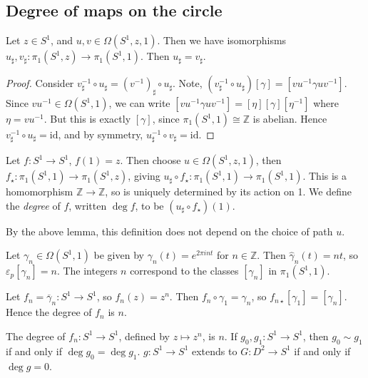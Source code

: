 \subsection{Degree of maps on the circle}
\begin{lemma}
	Let \( z \in S^1 \), and \( u, v \in \Omega(S^1, z, 1) \).
	Then we have isomorphisms \( u_\sharp, v_\sharp \colon \pi_1(S^1, z) \to \pi_1(S^1, 1) \).
	Then \( u_\sharp = v_\sharp \).
\end{lemma}
\begin{proof}
	Consider \( v_\sharp^{-1} \circ u_\sharp = (v^{-1})_\sharp \circ u_\sharp \).
	Note, \( (v_\sharp^{-1} \circ u_\sharp)[\gamma] = [vu^{-1}\gamma uv^{-1}] \).
	Since \( vu^{-1} \in \Omega(S^1, 1) \), we can write \( [vu^{-1}\gamma uv^{-1}] = [\eta][\gamma][\eta^{-1}] \) where \( \eta = vu^{-1} \).
	But this is exactly \( [\gamma] \), since \( \pi_1(S^1,1) \cong \mathbb Z \) is abelian.
	Hence \( v_\sharp^{-1} \circ u_\sharp = \mathrm{id} \), and by symmetry, \( u_\sharp^{-1} \circ v_\sharp = \mathrm{id} \).
\end{proof}
\begin{definition}
	Let \( f \colon S^1 \to S^1 \), \( f(1) = z \).
	Then choose \( u \in \Omega(S^1, z, 1) \), then \( f_\star \colon \pi_1(S^1,1) \to \pi_1(S^1,z) \), giving \( u_\sharp \circ f_\star \colon \pi_1(S^1, 1) \to \pi_1(S^1, 1) \).
	This is	a homomorphism \( \mathbb Z \to \mathbb Z \), so is uniquely determined by its action on 1.
	We define the \emph{degree} of \( f \), written \( \deg f \), to be \( (u_\sharp \circ f_\star)(1) \).
\end{definition}
By the above lemma, this definition does not depend on the choice of path \( u \).
\begin{example}
	Let \( \gamma_n \in \Omega(S^1,1) \) be given by \( \gamma_n(t) = e^{2\pi i n t} \) for \( n \in \mathbb Z \).
	Then \( \hat \gamma_n(t) = n t \), so \( \varepsilon_p[\gamma_n] = n \).
	The integers \( n \) correspond to the classes \( [\gamma_n] \) in \( \pi_1(S^1,1) \).

	Let \( f_n = \overline \gamma_n \colon S^1 \to S^1 \), so \( f_n(z) = z^n \).
	Then \( f_n \circ \gamma_1 = \gamma_n \), so \( f_{n\star}[\gamma_1] = [\gamma_n] \).
	Hence the degree of \( f_n \) is \( n \).
\end{example}
\begin{proposition}
	The degree of \( f_n : S^1 \to S^1 \), defined by \( z \mapsto z^n \), is \( n \).
	If \( g_0, g_1 \colon S^1 \to S^1 \), then \( g_0 \sim g_1 \) if and only if \( \deg g_0 = \deg g_1 \).
	\( g \colon S^1 \to S^1 \) extends to \( G \colon D^2 \to S^1 \) if and only if \( \deg g = 0 \).
\end{proposition}
